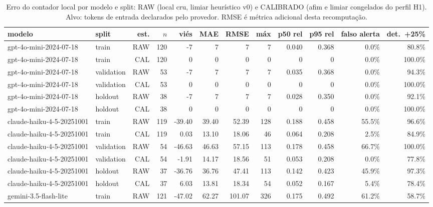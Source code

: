 
\begin{table}[htbp]\centering\small
\caption{Erro do contador local por modelo e split: RAW (local cru, limiar heur\'istico v0) e CALIBRADO (afim e limiar congelados do perfil H1). Alvo: tokens de entrada declarados pelo provedor. RMSE \'e m\'etrica adicional desta recomputa\c{c}\~ao.}
\label{tab:r05-split}
\begin{tabular}{llrrrrrrrrrr}
\toprule
modelo & split & est. & $n$ & vi\'es & MAE & RMSE & m\'ax & p50 rel & p95 rel & falso alerta & det.\ +25\% \\
\midrule
gpt-4o-mini-2024-07-18 & train & RAW & 120 & -7 & 7 & 7 & 7 & 0.040 & 0.368 & 0.0\% & 80.8\% \\
gpt-4o-mini-2024-07-18 & train & CAL & 120 & 0 & 0 & 0 & 0 & 0 & 0 & 0.0\% & 100.0\% \\
gpt-4o-mini-2024-07-18 & validation & RAW & 53 & -7 & 7 & 7 & 7 & 0.035 & 0.368 & 0.0\% & 94.3\% \\
gpt-4o-mini-2024-07-18 & validation & CAL & 53 & 0 & 0 & 0 & 0 & 0 & 0 & 0.0\% & 100.0\% \\
gpt-4o-mini-2024-07-18 & holdout & RAW & 38 & -7 & 7 & 7 & 7 & 0.028 & 0.350 & 0.0\% & 92.1\% \\
gpt-4o-mini-2024-07-18 & holdout & CAL & 38 & 0 & 0 & 0 & 0 & 0 & 0 & 0.0\% & 100.0\% \\
claude-haiku-4-5-20251001 & train & RAW & 119 & -39.40 & 39.40 & 52.39 & 128 & 0.188 & 0.458 & 55.5\% & 96.6\% \\
claude-haiku-4-5-20251001 & train & CAL & 119 & 0.03 & 13.10 & 18.06 & 46 & 0.064 & 0.208 & 2.5\% & 84.9\% \\
claude-haiku-4-5-20251001 & validation & RAW & 54 & -46.63 & 46.63 & 57.15 & 113 & 0.178 & 0.458 & 66.7\% & 100.0\% \\
claude-haiku-4-5-20251001 & validation & CAL & 54 & -1.91 & 14.17 & 18.56 & 51 & 0.053 & 0.208 & 0.0\% & 77.8\% \\
claude-haiku-4-5-20251001 & holdout & RAW & 37 & -36.76 & 36.76 & 47.41 & 113 & 0.142 & 0.423 & 45.9\% & 97.3\% \\
claude-haiku-4-5-20251001 & holdout & CAL & 37 & 6.03 & 13.81 & 18.34 & 54 & 0.052 & 0.167 & 5.4\% & 78.4\% \\
gemini-3.5-flash-lite & train & RAW & 121 & -47.02 & 62.27 & 101.07 & 326 & 0.175 & 0.492 & 61.2\% & 58.7\% \\

\end{tabular}
\end{table}
